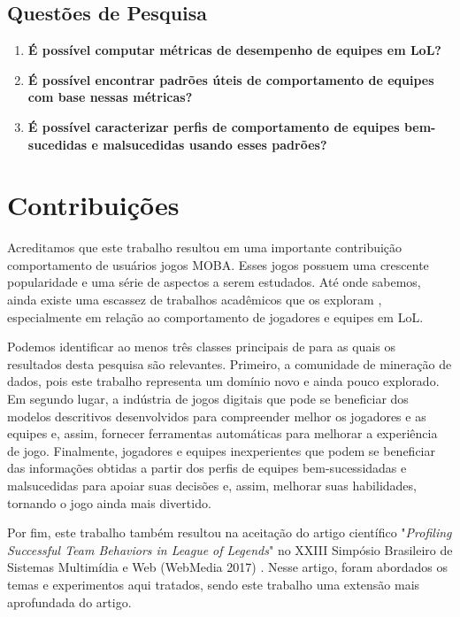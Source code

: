 \subsection{Questões de Pesquisa}

\begin{enumerate}[label=(\roman*)]
  \item \fj{}{}\textbf{É possível computar métricas de desempenho de equipes em LoL?}
  \item \fj{}{}\textbf{É possível encontrar padrões úteis de comportamento de equipes com base nessas métricas?}
  \item \fj{}{}\textbf{É possível caracterizar perfis de comportamento de equipes bem-sucedidas e malsucedidas usando esses padrões?}
\end{enumerate}

\section{Contribuições}
Acreditamos que este trabalho resultou em uma importante contribuição  comportamento de usuários  jogos MOBA. Esses jogos possuem uma crescente popularidade e uma série de aspectos a serem estudados. Até onde sabemos, ainda existe uma escassez de trabalhos acadêmicos que os exploram \cite{drachen2014skill} \cite{ong2015player}, especialmente em relação ao comportamento de jogadores e equipes em LoL.

Podemos identificar ao menos três classes principais de \textit{} para as quais os resultados desta pesquisa são relevantes. Primeiro, a comunidade de mineração de dados, pois este trabalho representa um domínio novo e ainda pouco explorado. Em segundo lugar, a indústria de jogos digitais que pode se beneficiar dos modelos descritivos  desenvolvidos para compreender melhor os jogadores e as equipes e, assim, fornecer ferramentas automáticas para melhorar a experiência de jogo. Finalmente, jogadores e equipes inexperientes que podem se beneficiar das informações obtidas a partir dos perfis de equipes bem-sucessidadas e malsucedidas para apoiar suas decisões e, assim, melhorar suas habilidades, tornando o jogo ainda mais divertido.

Por fim, este trabalho também resultou na aceitação do artigo científico "\textit{Profiling Successful Team Behaviors in League of Legends}" no XXIII Simpósio Brasileiro de Sistemas Multimídia e Web (WebMedia 2017) . Nesse artigo, foram abordados os temas e experimentos aqui tratados, sendo este trabalho uma extensão mais aprofundada do artigo.

